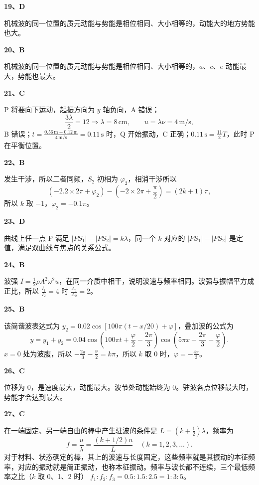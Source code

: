 \documentclass[UTF8,zihao=5,fontset=none,a4paper]{ctexart}
\newcounter{question}
\newcommand{\ans}[2]{\par\Needspace{4\baselineskip}\textbf{#1、#2}\par}
\newenvironment{questionblock}{\par\addvspace{5pt}\noindent
  \begin{minipage}{\linewidth}\setlength{\parskip}{4pt}}
  {\end{minipage}\par\addvspace{5pt}}
\begin{document}
\begin{questionblock}
\ans{19}{D}
机械波的同一位置的质元动能与势能是相位相同、大小相等的，动能大的地方势能也大。
\end{questionblock}
\begin{questionblock}
\ans{20}{B}
机械波的同一位置的质元动能与势能是相位相同、大小相等的，$a$、$c$、$e$ 动能最大，势能也最大。
\end{questionblock}
\begin{questionblock}
\ans{21}{C}
P 将要向下运动，起振方向为 $y$ 轴负向，A 错误；
\[
\frac{3\lambda}2=12\Rightarrow\lambda=8\,\mathrm{cm},
\qquad u=\lambda\nu=4\,\mathrm{m/s},
\]
B 错误；$t=\frac{0.56\,\mathrm m-0.12\,\mathrm m}{4\,\mathrm{m/s}}=0.11\,\mathrm s$ 时，Q 开始振动，C 正确；$0.11\,\mathrm s=\frac{11}2T$，此时 P 在平衡位置。
\end{questionblock}
\begin{questionblock}
\ans{22}{B}
发生干涉，所以二者同频，$S_2$ 初相为 $\varphi_2$，相消干涉所以
\[
(-2.2\times2\pi+\varphi_2)-\left(-2\times2\pi+\frac\pi2\right)=(2k+1)\pi,
\]
所以 $k$ 取 $-1$，$\varphi_2=-0.1\pi$。
\end{questionblock}
\begin{questionblock}
\ans{23}{D}
曲线上任一点 P 满足 $|PS_1|-|PS_2|=k\lambda$，同一个 $k$ 对应的 $|PS_1|-|PS_2|$ 是定值，满足双曲线与焦点的关系公式。
\end{questionblock}
\begin{questionblock}
\ans{24}{B}
波强 $I=\frac12\rho A^2\omega^2u$，在同一介质中相干，说明波速与频率相同。波强与振幅平方成正比，所以 $\frac{I_1}{I_2}=4$ 时 $\frac{A_1}{A_2}=2$。
\end{questionblock}
\begin{questionblock}
\ans{25}{B}
该简谐波表达式为
$y_2=0.02\cos[100\pi(t-x/20)+\varphi]$，叠加波的公式为
\[
y=y_1+y_2
=0.04\cos\left(100\pi t+\frac\varphi2-\frac{2\pi}3\right)
\cos\left(5\pi x-\frac{2\pi}3-\frac\varphi2\right).
\]
$x=0$ 处为波腹，所以 $-\frac{2\pi}3-\frac\varphi2=k\pi$，所以 $k$ 取 0 时，$\varphi=-\frac{4\pi}3$。
\end{questionblock}
\begin{questionblock}
\ans{26}{C}
位移为 0，是速度最大，动能最大。波节处动能始终为 0。驻波各点位移最大时，势能才会达到最大。
\end{questionblock}
\begin{questionblock}
\ans{27}{C}
在一端固定、另一端自由的棒中产生驻波的条件是 $L=(k+\frac12)\lambda$，频率为
\[
f=\frac u\lambda=\frac{(k+1/2)u}{L}\quad(k=1,2,3,\ldots).
\]
对于材料、状态确定的棒，其上的波速与长度固定，这些频率就是其振动的本征频率，对应的振动就是简正振动，也称本征振动。频率与波长都不连续，三个最低频率之比（$k$ 取 0、1、2 时）
$f_1:f_2:f_3=0.5:1.5:2.5=1:3:5$。
\end{questionblock}
\end{document}
